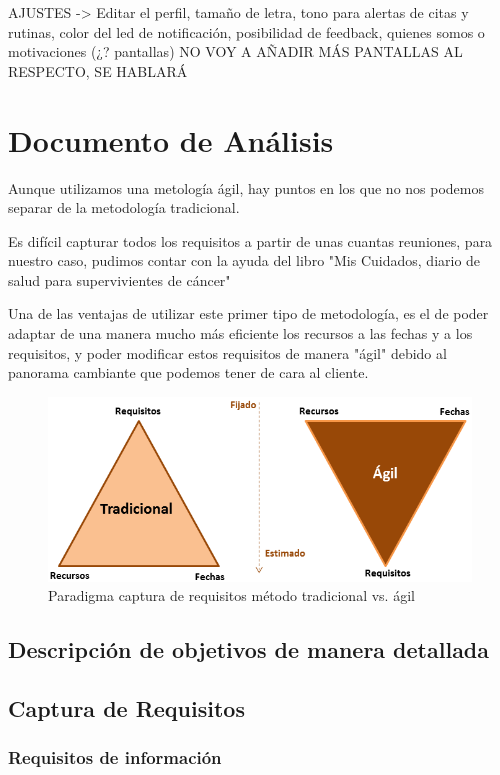 \documentclass[../pfc.tex]{subfiles}
\begin{document}
	AJUSTES  ->  	Editar el perfil, 
	tamaño de letra, 	
	tono para alertas de citas y rutinas, 
	color del led de notificación, 
	posibilidad de feedback,
	quienes somos o motivaciones (¿? pantallas)
	NO VOY A AÑADIR MÁS PANTALLAS AL RESPECTO, SE HABLARÁ
	
	\section{Documento de Análisis}
	
			Aunque utilizamos una metología ágil, hay puntos en los que no nos podemos separar de la metodología tradicional.
			
			Es difícil capturar todos los requisitos a partir de unas cuantas reuniones, para nuestro caso, pudimos contar con la ayuda del libro "Mis Cuidados, diario de salud para supervivientes de cáncer"
			
			Una de las ventajas de utilizar este primer tipo de metodología, es el de poder adaptar de una manera mucho más eficiente los recursos a las fechas y a los requisitos, y poder modificar estos requisitos de manera "ágil" debido al panorama cambiante que podemos tener de cara al cliente.
			
			\begin{figure}
				\centering
				\includegraphics[width=0.5\linewidth]{../images/paradigmaRequisitos}
				\caption{Paradigma captura de requisitos método tradicional vs. ágil}
				\label{fig:paradigmaRequisitos}
			\end{figure}
			
			
			\subsection{Descripción de objetivos de manera detallada}
	
		\subsection{Captura de Requisitos}
	
			\subsubsection{Requisitos de información}
	
\end{document}
